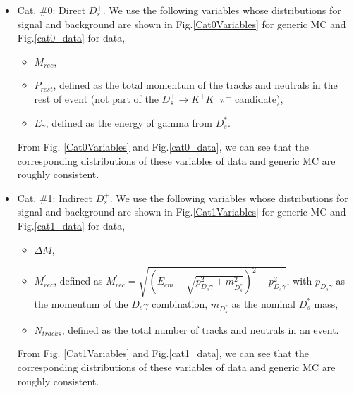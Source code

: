 \begin{itemize}
    \item Cat. \#0: Direct $D_{s}^{+}$. We use the following variables whose distributions for signal and background are shown in Fig.\ref{Cat0Variables} for generic MC and Fig.\ref{cat0_data} for data,
        \begin{itemize}
            \item[1. ] $M_{rec}$,
            \item[2. ] $P_{rest}$, defined as the total momentum of the tracks and neutrals in the rest of event (not part of the $D_{s}^{+} \rightarrow K^{+}K^{-}\pi^{+}$ candidate),
            \item[3. ] $E_{\gamma}$, defined as the energy of gamma from $D_{s}^{*}$.
        \end{itemize}
        From Fig. \ref{Cat0Variables} and Fig.\ref{cat0_data}, we can see that the corresponding distributions of these variables of data and generic MC are roughly consistent.
        

    \item Cat. \#1: Indirect $D_{s}^{+}$.
        We use the following variables whose distributions for signal and background are shown in Fig.\ref{Cat1Variables} for generic MC and Fig.\ref{cat1_data} for data,
        \begin{itemize}
            \item[1. ] $\Delta{M}$,
            \item[2. ] $M_{rec}^{'}$, defined as $M_{rec}^{'} = \sqrt{ {(E_{cm}  - \sqrt{p_{D_{s}\gamma}^{2} + m_{D_{s}^{*}}^{2}}) }^{2} - p_{D_{s}\gamma}^{2}}$, with $p_{D_{s}\gamma}$ as the momentum of the $D_{s}\gamma$ combination, $m_{D_{s}^{*}}$ as the nominal ${D_{s}^{*}}$ mass,
            \item[3. ] $N_{tracks}$, defined as the total number of tracks and neutrals in an event.
        \end{itemize}
        From Fig. \ref{Cat1Variables} and Fig.\ref{cat1_data}, we can see that the corresponding distributions of these variables of data and generic MC are roughly consistent.
\end{itemize}



